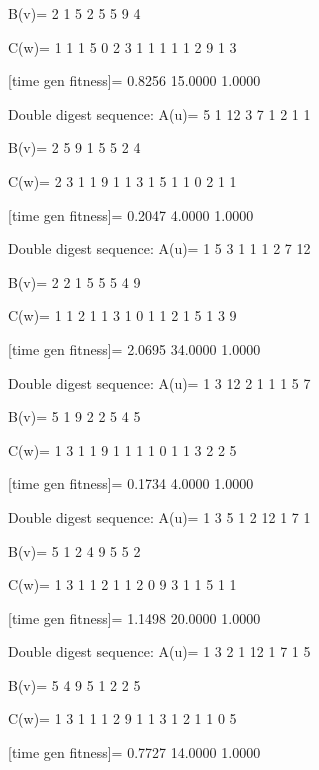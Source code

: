 B(v)=
     2     1     5     2     5     5     9     4

C(w)=
     1     1     1     5     0     2     3     1     1     1     1     1     2     9     1     3

[time gen fitness]=
    0.8256   15.0000    1.0000

Double digest sequence:
A(u)=
     5     1    12     3     7     1     2     1     1

B(v)=
     2     5     9     1     5     5     2     4

C(w)=
     2     3     1     1     9     1     1     3     1     5     1     1     0     2     1     1

[time gen fitness]=
    0.2047    4.0000    1.0000

Double digest sequence:
A(u)=
     1     5     3     1     1     1     2     7    12

B(v)=
     2     2     1     5     5     5     4     9

C(w)=
     1     1     2     1     1     3     1     0     1     1     2     1     5     1     3     9

[time gen fitness]=
    2.0695   34.0000    1.0000

Double digest sequence:
A(u)=
     1     3    12     2     1     1     1     5     7

B(v)=
     5     1     9     2     2     5     4     5

C(w)=
     1     3     1     1     9     1     1     1     1     0     1     1     3     2     2     5

[time gen fitness]=
    0.1734    4.0000    1.0000

Double digest sequence:
A(u)=
     1     3     5     1     2    12     1     7     1

B(v)=
     5     1     2     4     9     5     5     2

C(w)=
     1     3     1     1     2     1     1     2     0     9     3     1     1     5     1     1

[time gen fitness]=
    1.1498   20.0000    1.0000

Double digest sequence:
A(u)=
     1     3     2     1    12     1     7     1     5

B(v)=
     5     4     9     5     1     2     2     5

C(w)=
     1     3     1     1     1     2     9     1     1     3     1     2     1     1     0     5

[time gen fitness]=
    0.7727   14.0000    1.0000

